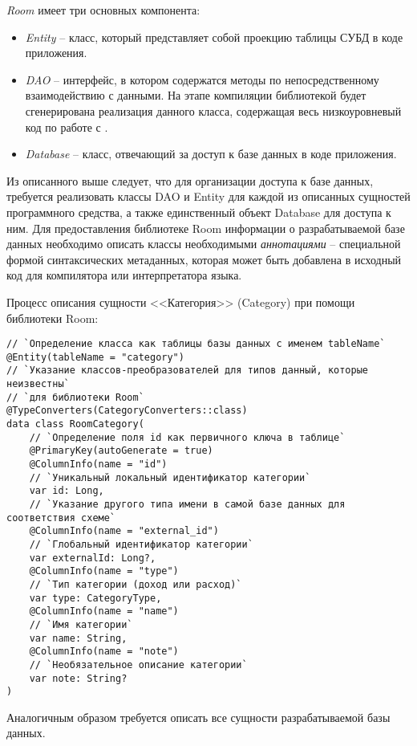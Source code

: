 \emph{Room} имеет три основных компонента:
\begin{itemize}
    \item \emph{Entity} -- класс, который представляет собой проекцию таблицы СУБД \sqlite в коде приложения.
    \item \emph{DAO} -- интерфейс, в котором содержатся методы по непосредственному взаимодействию с данными.
    На этапе компиляции библиотекой будет сгенерирована реализация данного класса, содержащая весь низкоуровневый код по работе с \sqlite.
    \item \emph{Database} -- класс, отвечающий за доступ к базе данных в коде приложения.
\end{itemize}

Из описанного выше следует, что для организации доступа к базе данных, требуется реализовать классы DAO и Entity для каждой из описанных сущностей программного средства, а также единственный объект Database для доступа к ним.
Для предоставления библиотеке Room информации о разрабатываемой базе данных необходимо описать классы необходимыми \emph{аннотациями} -- специальной формой синтаксических метаданных, которая может быть добавлена в исходный код для компилятора или интерпретатора языка.

Процесс описания сущности <<Категория>> (Category) при помощи библиотеки Room:

\begin{lstlisting}[style=standard]
// `Определение класса как таблицы базы данных с именем tableName`
@Entity(tableName = "category")
// `Указание классов-преобразователей для типов данный, которые неизвестны`
// `для библиотеки Room`
@TypeConverters(CategoryConverters::class)
data class RoomCategory(
    // `Определение поля id как первичного ключа в таблице`
    @PrimaryKey(autoGenerate = true)
    @ColumnInfo(name = "id")
    // `Уникальный локальный идентификатор категории`
    var id: Long,
    // `Указание другого типа имени в самой базе данных для соответствия схеме`
    @ColumnInfo(name = "external_id")
    // `Глобальный идентификатор категории`
    var externalId: Long?,
    @ColumnInfo(name = "type")
    // `Тип категории (доход или расход)`
    var type: CategoryType,
    @ColumnInfo(name = "name")
    // `Имя категории`
    var name: String,
    @ColumnInfo(name = "note")
    // `Необязательное описание категории`
    var note: String?
)
\end{lstlisting}

Аналогичным образом требуется описать все сущности разрабатываемой базы данных.

